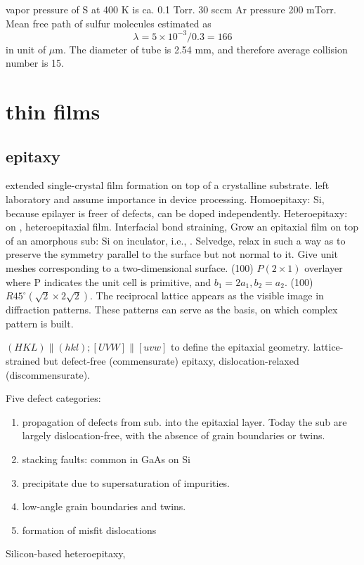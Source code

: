 vapor pressure of S at 400 K is ca. 0.1 Torr. 30 sccm Ar pressure 200 mTorr. Mean free path of sulfur molecules estimated as 
\[
\lambda = 5\times 10^{-3}/0.3 = 166 
\]
in unit of $\mu$m. The diameter of tube is 2.54 mm, and therefore average collision number is 15.

\section{thin films}
\subsection{epitaxy}

extended single-crystal film formation on top of a crystalline substrate. left laboratory and assume importance in device processing. Homoepitaxy: Si, because epilayer is freer of defects, can be doped independently. Heteroepitaxy:  on , heteroepitaxial film. Interfacial bond straining, Grow an epitaxial film on top of an amorphous sub: Si on inculator, i.e., . Selvedge, relax in such a way as to preserve the symmetry parallel to the surface but not normal to it. Give unit meshes corresponding to a two-dimensional surface. (100) $P(2\times 1)$ overlayer where P indicates the unit cell is primitive, and $b_1 = 2 a_1, b_2 = a_2$. (100) $R45^{\circ}(\sqrt{2}\times 2\sqrt{2})$. The reciprocal lattice appears as the visible image in diffraction patterns. These patterns can serve as the basis, on which complex pattern is built. 

$(HKL)\parallel(hkl);[UVW]\parallel[uvw]$ to define the epitaxial geometry. lattice-strained but defect-free (commensurate) epitaxy, dislocation-relaxed (discommensurate). 

Five defect categories:
\begin{enumerate}
\item propagation of defects from sub. into the epitaxial layer. Today the sub are largely dislocation-free, with the absence of grain boundaries or twins. 
\item stacking faults: common in GaAs on Si 
\item precipitate due to supersaturation of impurities. 
\item low-angle grain boundaries and twins.
\item formation of misfit dislocations
\end{enumerate}

Silicon-based heteroepitaxy, 

